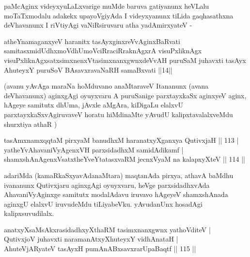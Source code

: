 
\begin{artha}
paMcAginx videyxyuLaLxvarige muMde baruva gatiyanunx heVLalu  moTaTxmodalu adakekx upayoVgiyAda I videyxyanunx tiLida gaqhasathxna deVhavanunx I riVtiyAgi vaNiRsiruvaru atha yadAmirxyateV -
\end{artha}

\begin{kandikeshl}
atheYnamaganxyeV haranitx tasAyxginxreVvAginxBaRvati samitasxmidUdhxmoV\break dhUmoV\s ciRraciRraknAgxrA visuPxliknAgx visuPxliknAgxsatxsimxnenxVtasimxnanxgwnx\break deVvAH puruSaM juhavxti tasAyx AhuteyxY puruSoV BAsavxravaNaRH samaBxvati ||14||
\end{kandikeshl}



\begin{artha}
(avanu yAvAga maraNa hoMduvano anaMtaraveV Itananunx (avana  deVhavanunx) aginxgAgi oyuyxvaru A puruSanige parxtayxkaSx aginxyeV aginx, hAgeye samitutx dhUma, jAvxle aMgAra, kiDigaLu elalxvU  parxtayxkaSxvAgiruvaveV horatu hiMdinaMte yAvudU kalipxtavalalxveMdu  shurxtiya athaR )
\end{artha}


\begin{shl}
tasAmxnamxqqtaM pirxyaM banudhxM haranatxyXganxya QutivxjaH \hfill|| 113 | \\
yatheYvA\s \s havaniVyAgenxVH parxsidadhxM samidAdikamf | \\
shamxshAnAgenxVsatxtheYveYtatasxvaRM jecnxVyaM na kalapxyXteV \hfill|| 114 || 
\end{shl}

\begin{artha}
adariMda (kamaRkaSxyavAdanaMtara) maqtanAda pirxya, athavA baMdhu
ivananunx Qutivxjaru aginxgAgi oyuyxvaru, heVge parxsidadhxvAda
AhavaniVyAginxge samitutx modalAdavu iruvavo hAgeyeV shamxshAnada
aginxgU elalxvU iruvudeMdu tiLiyabeVku. yAvudanUnx hosadAgi
kalipxsuvudilalx.
\end{artha}

\begin{shl}
anatxyXsaMsAkxrasidadhxyXthaRM tasimxnanxgwnx yathoVditeV | \\
QutivxjoV juhavxti naramanAtxyXhuteyxY vidhAnataH | \\
AhuteVjARyateV tasAyxH pumAnABxsavxrarUpaBaqtf \hfill|| 115 || 
\end{shl}

